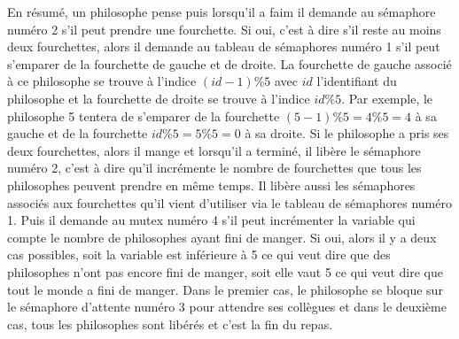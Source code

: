 \documentclass[a4paper,12pt]{report}
\begin{document}
En résumé, un philosophe pense puis lorsqu'il a faim il demande au sémaphore numéro 2 s'il peut prendre une fourchette. Si oui, c'est à dire s'il reste au moins deux fourchettes, alors il demande au tableau de sémaphores numéro 1 s'il peut s'emparer de la fourchette de gauche et de droite. La fourchette de gauche associé à ce philosophe se trouve à l'indice $(id - 1) \% 5$ avec $id$ l'identifiant du philosophe et la fourchette de droite se trouve à l'indice $id \% 5$. Par exemple, le philosophe 5 tentera de s'emparer de la fourchette $(5 - 1) \% 5 = 4 \% 5 = 4$ à sa gauche et de la fourchette $id \% 5 = 5 \% 5 = 0$ à sa droite.
Si le philosophe a pris ses deux fourchettes, alors il mange et lorsqu'il a terminé, il libère le sémaphore numéro 2, c'est à dire qu'il incrémente le nombre de fourchettes que tous les philosophes peuvent prendre en même temps. Il libère aussi les sémaphores associés aux fourchettes qu'il vient d'utiliser via le tableau de sémaphores numéro 1.
Puis il demande au mutex numéro 4 s'il peut incrémenter la variable qui compte le nombre de philosophes ayant fini de manger. Si oui, alors il y a deux cas possibles, soit la variable est inférieure à 5 ce qui veut dire que des philosophes n'ont pas encore fini de manger, soit elle vaut 5 ce qui veut dire que tout le monde a fini de manger. Dans le premier cas, le philosophe se bloque sur le sémaphore d'attente numéro 3 pour attendre ses collègues et dans le deuxième cas, tous les philosophes sont libérés et c'est la fin du repas.

\newpage
\end{document}
